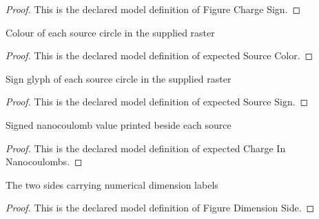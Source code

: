 \begin{proof}
  This is the declared model definition of Figure Charge Sign.
\end{proof}
\begin{definition}
  \label{def:physics:phyx-mini-0834:phyxminiproblems-problemphyxmini0834-expectedsourcecolor}
  Colour of each source circle in the supplied raster
\end{definition}
\begin{proof}
  This is the declared model definition of expected Source Color.
\end{proof}
\begin{definition}
  \label{def:physics:phyx-mini-0834:phyxminiproblems-problemphyxmini0834-expectedsourcesign}
  Sign glyph of each source circle in the supplied raster
\end{definition}
\begin{proof}
  This is the declared model definition of expected Source Sign.
\end{proof}
\begin{definition}
  \label{def:physics:phyx-mini-0834:phyxminiproblems-problemphyxmini0834-expectedchargeinnanocoulombs}
  Signed nanocoulomb value printed beside each source
\end{definition}
\begin{proof}
  This is the declared model definition of expected Charge In Nanocoulombs.
\end{proof}
\begin{definition}
  \label{def:physics:phyx-mini-0834:phyxminiproblems-problemphyxmini0834-figuredimensionside}
  The two sides carrying numerical dimension labels
\end{definition}
\begin{proof}
  This is the declared model definition of Figure Dimension Side.
\end{proof}
